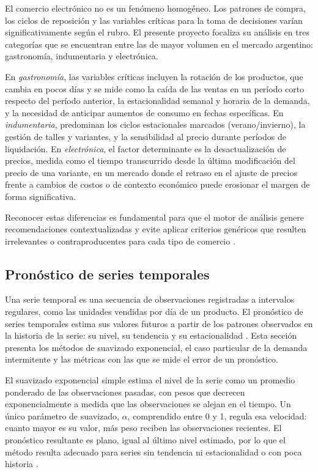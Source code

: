 El comercio electrónico no es un fenómeno homogéneo. Los patrones de compra, los ciclos de reposición y las variables críticas para la toma de decisiones varían significativamente según el rubro. El presente proyecto focaliza su análisis en tres categorías que se encuentran entre las de mayor volumen en el mercado argentino: gastronomía, indumentaria y electrónica.

En \emph{gastronomía}, las variables críticas incluyen la rotación de los productos, que cambia en pocos días y se mide como la caída de las ventas en un período corto respecto del período anterior, la estacionalidad semanal y horaria de la demanda, y la necesidad de anticipar aumentos de consumo en fechas específicas. En \emph{indumentaria}, predominan los ciclos estacionales marcados (verano/invierno), la gestión de talles y variantes, y la sensibilidad al precio durante períodos de liquidación. En \emph{electrónica}, el factor determinante es la desactualización de precios, medida como el tiempo transcurrido desde la última modificación del precio de una variante, en un mercado donde el retraso en el ajuste de precios frente a cambios de costos o de contexto económico puede erosionar el margen de forma significativa.

Reconocer estas diferencias es fundamental para que el motor de análisis genere recomendaciones contextualizadas y evite aplicar criterios genéricos que resulten irrelevantes o contraproducentes para cada tipo de comercio \parencite{CACE2025, Tiendanube2026}.

\subsection{Pronóstico de series temporales}
\label{sec:pronostico}

Una serie temporal es una secuencia de observaciones registradas a intervalos regulares, como las unidades vendidas por día de un producto. El pronóstico de series temporales estima sus valores futuros a partir de los patrones observados en la historia de la serie: su nivel, su tendencia y su estacionalidad \parencite{Hyndman2021}. Esta sección presenta los métodos de suavizado exponencial, el caso particular de la demanda intermitente y las métricas con las que se mide el error de un pronóstico.

El suavizado exponencial simple estima el nivel de la serie como un promedio ponderado de las observaciones pasadas, con pesos que decrecen exponencialmente a medida que las observaciones se alejan en el tiempo. Un único parámetro de suavizado, $\alpha$, comprendido entre 0 y 1, regula esa velocidad: cuanto mayor es su valor, más peso reciben las observaciones recientes. El pronóstico resultante es plano, igual al último nivel estimado, por lo que el método resulta adecuado para series sin tendencia ni estacionalidad o con poca historia \parencite{Hyndman2021}.

